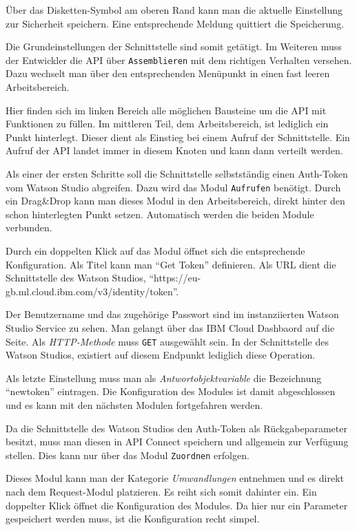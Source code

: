 Über das Disketten-Symbol am oberen Rand kann man die aktuelle Einstellung zur Sicherheit speichern. Eine entsprechende
Meldung quittiert die Speicherung.

Die Grundeinstellungen der Schnittstelle sind somit getätigt. Im Weiteren muss der Entwickler die API über
\texttt{Assemblieren} mit dem richtigen Verhalten versehen. Dazu wechselt man über den entsprechenden Menüpunkt in einen
fast leeren Arbeitsbereich.

Hier finden sich im linken Bereich alle möglichen Bausteine um die API mit Funktionen zu füllen. Im mittleren Teil, dem
Arbeitsbereich, ist lediglich ein Punkt hinterlegt. Dieser dient als Einstieg bei einem Aufruf der Schnittstelle. Ein
Aufruf der API landet immer in diesem Knoten und kann dann verteilt werden.

Als einer der ersten Schritte soll die Schnittstelle selbstständig einen Auth-Token vom Watson Studio abgreifen. Dazu
wird das Modul \texttt{Aufrufen} benötigt. Durch ein Drag\&Drop kann man dieses Modul in den Arbeitsbereich, direkt
hinter den schon hinterlegten Punkt setzen. Automatisch werden die beiden Module verbunden.

Durch ein doppelten Klick auf das Modul öffnet sich die entsprechende Konfiguration. Als Titel kann man \enquote{Get Token}
definieren. Als URL dient die Schnittstelle des Watson Studios, \enquote{https://eu-gb.ml.cloud.ibm.com/v3/identity/token}.

Der Benutzername und das zugehörige Passwort sind im instanziierten Watson Studio Service zu sehen. Man gelangt über das
IBM Cloud Dashbaord auf die Seite. Als \textit{HTTP-Methode} muss \texttt{GET} ausgewählt sein. In der Schnittstelle des
Watson Studios, existiert auf diesem Endpunkt lediglich diese Operation.

Als letzte Einstellung muss man als \textit{Antwortobjektvariable} die Bezeichnung \enquote{newtoken} eintragen. Die
Konfiguration des Modules ist damit abgeschlossen und es kann mit den nächsten Modulen fortgefahren werden.

Da die Schnittstelle des Watson Studios den Auth-Token als Rückgabeparameter besitzt, muss man diesen in API Connect
speichern und allgemein zur Verfügung stellen. Dies kann nur über das Modul \texttt{Zuordnen} erfolgen.

Dieses Modul kann man der Kategorie \textit{Umwandlungen} entnehmen und es direkt nach dem Request-Modul platzieren. Es
reiht sich somit dahinter ein. Ein doppelter Klick öffnet die Konfiguration des Modules. Da hier nur ein Parameter
gespeichert werden muss, ist die Konfiguration recht simpel.

